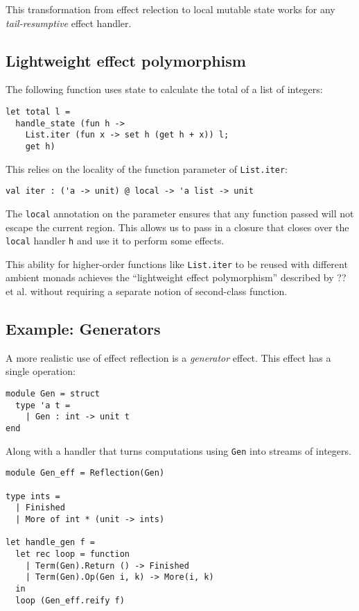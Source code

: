 \documentclass[acmsmall, screen, nonacm]{acmart}
\theoremstyle{definition}
\begin{document}
This transformation from effect relection to local mutable state works
for any \emph{tail-resumptive} effect handler.

\subsection{Lightweight effect polymorphism}

The following function uses state to calculate the total of a list of
integers:
\begin{lstlisting}[style=ocaml]
let total l =
  handle_state (fun h ->
    List.iter (fun x -> set h (get h + x)) l;
    get h)
\end{lstlisting}
This relies on the locality of the function parameter of
\lstinline[style=ocaml]{List.iter}:
\begin{lstlisting}[style=ocaml]
val iter : ('a -> unit) @ local -> 'a list -> unit
\end{lstlisting}
The \lstinline[style=ocaml]{local} annotation on the parameter ensures
that any function passed will not escape the current region. This allows
us to pass in a closure that closes over the
\lstinline[style=ocaml]{local} handler \lstinline[style=ocaml]{h} and
use it to perform some effects.

This ability for higher-order functions like
\lstinline[style=ocaml]{List.iter} to be reused with different ambient
monads achieves the ``lightweight effect polymorphism'' described by ??
et al.\cite{??} without requiring a separate notion of second-class
function.

\subsection{Example: Generators}

A more realistic use of effect reflection is a \emph{generator}
effect. This effect has a single operation:
\begin{lstlisting}[style=ocaml]
module Gen = struct
  type 'a t =
    | Gen : int -> unit t
end
\end{lstlisting}
Along with a handler that turns computations using
\lstinline[style=ocaml]{Gen} into streams of integers.
\begin{lstlisting}[style=ocaml]
module Gen_eff = Reflection(Gen)

type ints =
  | Finished
  | More of int * (unit -> ints)

let handle_gen f =
  let rec loop = function
    | Term(Gen).Return () -> Finished
    | Term(Gen).Op(Gen i, k) -> More(i, k)
  in
  loop (Gen_eff.reify f)
\end{lstlisting}
\end{document}
